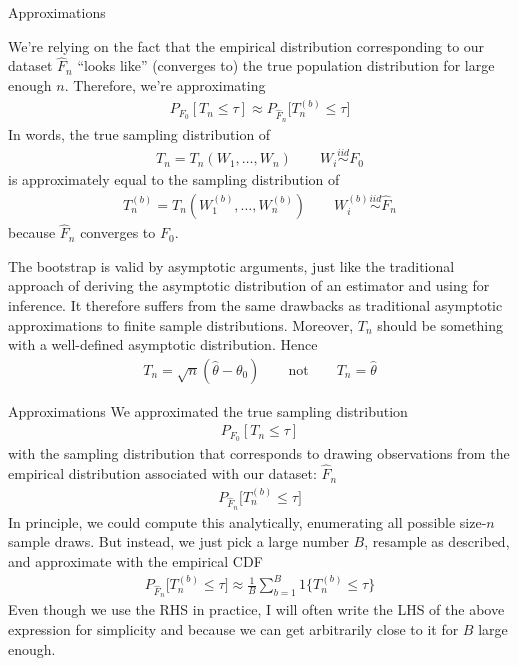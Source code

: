 \documentclass[aspectratio=169, handout]{beamer}
\newcommand{\iid}{\overset{iid}{\sim}}
\begin{document}
{\scriptsize
\begin{frame}{Approximations}

We're relying on the fact that the empirical distribution corresponding
to our dataset $\hat{F}_n$ ``looks like'' (converges to) the true
population distribution for large enough $n$.
Therefore, we're approximating
\begin{align}
  P_{F_0}[T_n \leq \tau]
  \approx
  P_{\hat{F}_n}
  \big[
  T_n^{(b)}\leq \tau
  \big]
  \label{bootapproxasymptotic}
\end{align}
In words, the \alert{true} sampling distribution of
\begin{align*}
T_n=T_n(W_1,\ldots,W_n)
\qquad
W_i\iid F_0
\end{align*}
is approximately equal to the sampling distribution of
\begin{align*}
  T_n^{(b)}=T_n(W_1^{(b)},\ldots,W_n^{(b)})
  \qquad
  W_i^{(b)}
  \iid
  \hat{F}_n
\end{align*}
because $\hat{F}_n$ converges to $F_0$.

The bootstrap is valid by asymptotic arguments, just like the
traditional approach of deriving the asymptotic distribution of an
estimator and using for inference.
It therefore suffers from the same drawbacks as traditional
asymptotic approximations to finite sample distributions.
Moreover, $T_n$ should be something with a well-defined
asymptotic distribution.
Hence
\begin{align*}
  T_n=\sqrt{n}(\hat{\theta}-\theta_0)
  \qquad
  \text{not}
  \qquad
  T_n=\hat{\theta}
\end{align*}
\end{frame}
}





{\footnotesize
\begin{frame}{Approximations}
We approximated the true sampling distribution
\begin{align*}
  P_{F_0}[T_n\leq \tau]
\end{align*}
with the sampling distribution that corresponds to drawing observations
from the empirical distribution associated with our dataset:
$\hat{F}_n$
\begin{align*}
  P_{\hat{F}_n}
  \big[
  T_n^{(b)}\leq \tau
  \big]
\end{align*}
In principle, we could compute this analytically, enumerating all
possible size-$n$ sample draws.
But instead, we just pick a large number $B$, resample as described, and
approximate with the empirical CDF
\begin{align*}
  P_{\hat{F}_n}
  \big[
  T_n^{(b)}\leq \tau
  \big]
  \approx
  \frac{1}{B}
  \sum_{b=1}^B
  1\{T_n^{(b)}\leq \tau\}
\end{align*}
Even though we use the RHS in practice, I will often write the LHS of
the above expression for simplicity and because we can get arbitrarily
close to it for $B$ large enough.
\end{frame}
}
\end{document}
